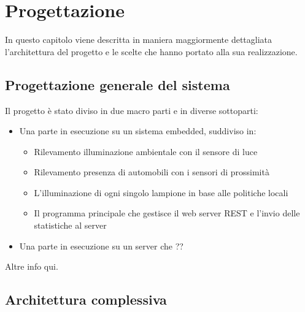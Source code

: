 \chapter{Progettazione}

In questo capitolo viene descritta in maniera maggiormente dettagliata l'architettura del progetto e le scelte che hanno portato alla sua realizzazione.

\section{Progettazione generale del sistema}

Il progetto è stato diviso in due macro parti e in diverse sottoparti: 
\begin{itemize}
	\item Una parte in esecuzione su un sistema embedded, suddiviso in:
	\begin{itemize}
		\item Rilevamento illuminazione ambientale con il sensore di luce
		\item Rilevamento presenza di automobili con i sensori di prossimità
		\item L'illuminazione di ogni singolo lampione in base alle politiche locali 
		\item Il programma principale che gestisce il web server REST e l'invio delle statistiche al server
	\end{itemize}
	\item Una parte in esecuzione su un server che ??
\end{itemize}

Altre info qui.

\section{Architettura complessiva}
